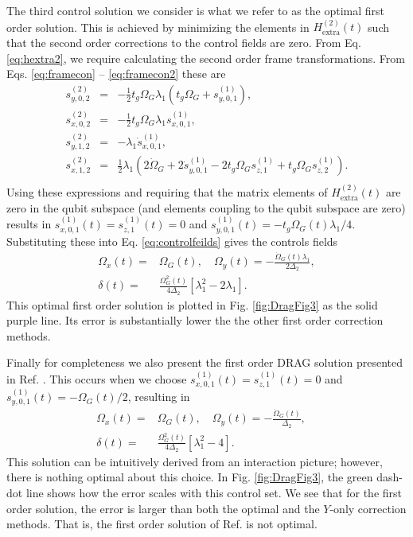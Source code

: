 \documentclass[pra,twocolumn,floatfix,superscriptaddress,eqsecnum]{revtex4-1}
\begin{document}
The third control solution we consider is what we refer to as the optimal first order solution. This is achieved by minimizing the elements in $H_\mathrm{extra}^{(2)}(t)$ such that the second order corrections to the control fields are zero. From Eq. \eqref{eq:hextra2}, we require calculating the second order frame transformations. From Eqs. \eqref{eq:framecon} -- \eqref{eq:framecon2} these are 
\begin{eqnarray}
\label{eq:framecon2or2}
 s^{(2)}_{y,0,2}&=&-\frac{1}{2}t_g\Omega_G \lambda_1 (t_g\Omega_G+ s^{(1)}_{y,0,1}),\\
s^{(2)}_{x,0,2}&=&-\frac{1}{2}t_g\Omega_G \lambda_1 s^{(1)}_{x,0,1},\\
 s^{(2)}_{y,1,2}&=&-\lambda_1\dot{s}^{(1)}_{x,0,1},\\
s^{(2)}_{x,1,2}&=&\frac{1}{2}\lambda_1(2\dot\Omega_G+2\dot s^{(1)}_{y,0,1}-2t_g \Omega_G s^{(1)}_{z,1} + t_g\Omega_G s^{(1)}_{z,2}).\nonumber\\
\end{eqnarray}
 Using these expressions and requiring that the matrix elements of $H_\mathrm{extra}^{(2)}(t)$ are zero in the qubit subspace (and elements coupling to the qubit subspace are zero) results in ${s}^{(1)}_{x,0,1}(t)={s}^{(1)}_{z,1}(t)=0$ and ${s}^{(1)}_{y,0,1}(t)=-t_g\Omega_G(t)\lambda_1/4$.  Substituting these into Eq. \eqref{eq:controlfeilds} gives the controls fields
\begin{equation}
\begin{split}
\Omega_{x}(t) =& \Omega_G(t) ,\quad
\Omega_{y}(t)=  -\frac{\dot\Omega_G(t)\lambda_1}{2\Delta_2},\\
\delta (t)=& \frac{\Omega_G^2(t)}{4\Delta_2}[\lambda_1^2 -2\lambda_1].
\label{eq:env_from_s}
  \end{split}
\end{equation} This optimal first order solution is plotted in Fig. \ref{fig:DragFig3} as the solid purple line. Its error is substantially lower the the other first order correction methods.

Finally for completeness we also present the first order DRAG solution presented in Ref. \cite{Motzoi2009}. This occurs when we choose ${s}^{(1)}_{x,0,1}(t)={s}^{(1)}_{z,1}(t)=0$ and ${s}^{(1)}_{y,0,1}(t)=-\Omega_G(t)/2$, resulting in
\begin{equation}
\begin{split}
\Omega_{x}(t) = &  \Omega_G(t) ,\quad
\Omega_{y}(t) =  -\frac{\dot\Omega_G(t)}{\Delta_2},\quad\\
\delta(t) =& \frac{ \Omega_G^2(t)}{4\Delta_2}[\lambda_1^2-4].
  \end{split}
\end{equation} This solution can be intuitively derived from an interaction picture; however, there is nothing optimal about this choice. In Fig. \ref{fig:DragFig3},  the green dash-dot line shows how the error scales with this control set.  We see that for the first order solution, the error is larger than both the optimal and the $Y$-only correction methods. That is, the first order solution of Ref. \cite{Motzoi2009} is not optimal.
\end{document}
